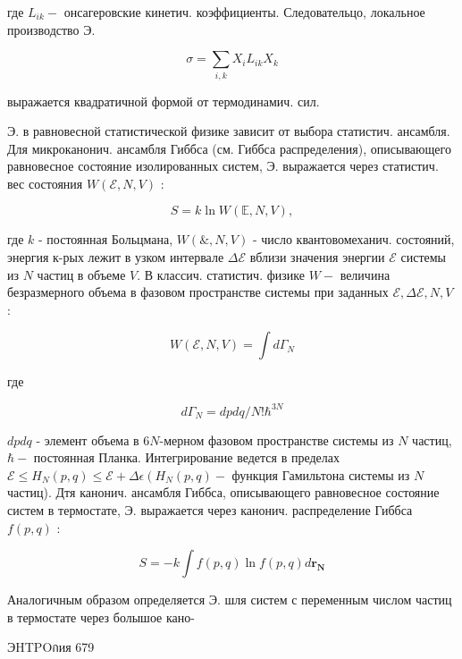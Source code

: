 \documentclass[10pt]{article}
\begin{document}
где $L_{i k}-$ онсагеровские кинетич. коэффициенты. Следовательцо, локальное производство Э.



\[

\sigma=\sum_{i, k} X_{i} L_{i k} X_{k}

\]



выражается квадратичной формой от термодинамич. сил.



Э. в равновесной статистической физике зависит от выбора статистич. ансамбля. Для микроканонич. ансамбля Гиббса (см. Гиббса распределения), описывающего равновесное состояние изолированных систем, Э. выражается через статистич. вес состояния $W(\mathscr{E}, N, V)$ :



\[

S=k \ln W(\mathbb{E}, N, V),

\]



где $k$ - постоянная Больцмана, $W(\mathscr{\&}, N, V)$ - число квантовомеханич. состояний, энергия к-рых лежит в узком интервале $\Delta \mathscr{E}$ вблизи значения энергии $\mathscr{E}$ системы из $N$ частиц в объеме $V$. В классич. статистич. физике $W-$ величина безразмерного объема в фазовом пространстве системы при заданных $\mathscr{E}, \Delta \mathscr{E}, N, V$ :



\[

W(\mathscr{E}, N, V)=\int d \Gamma_{N}

\]



где



\[

d \Gamma_{N}=d p d q / N ! \hbar^{3 N}

\]



$d p d q$ - элемент объема в $6 N$-мерном фазовом пространстве системы из $N$ частиц, $\hbar-$ постоянная Планка. Интегрирование ведется в пределах $\mathscr{E} \leqslant H_{N}(p, q) \leqslant \mathscr{E}+\Delta \mathscr{\epsilon}\left(H_{N}(p, q)-\right.$ функция Гамильтона системы из $N$ частиц). Дтя канонич. ансамбля Гиббса, описывающего равновесное состояние систем в термостате, Э. выражается через канонич. распределение Гиббса $f(p, q)$ :



\[

S=-k \int f(p, q) \ln f(p, q) d \mathbf{r}_{\boldsymbol{N}}

\]



Аналогичным образом определяется Э. шля систем с переменным числом частиц в термостате через болышое кано-



ЭHTPOกия 679
\end{document}

